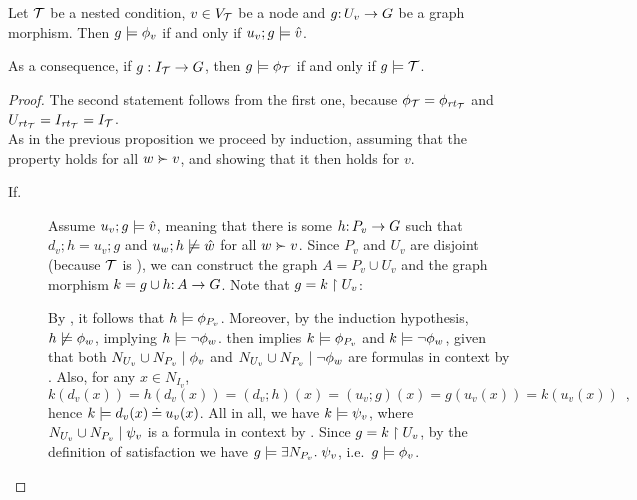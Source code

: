 \begin{theorem}
	\label{th:comparing satisfactions}
	Let ${\mathcal{T}}$ be a {\proper} nested condition, $v \in V_{\mathcal{T}}$ be a node and $g{:}\, U_v \rightarrow G$ be a graph morphism. Then $g\models \phi_v$ if and only if $u_v;g\models \hat v$. 
	
	As a consequence, if $g: I_{\mathcal{T}} \rightarrow G$, then $g\models\phi_{\mathcal{T}}$ if and only if $g\models{\mathcal{T}}$.
\end{theorem}
%
\begin{proof}
	The second statement follows from the first one, because $\phi_{\mathcal{T}} = \phi_{\mathit{rt}_{{\mathcal{T}}}}$ and $U_{\mathit{rt}_{{\mathcal{T}}}} = I_{\mathit{rt}_{{\mathcal{T}}}} = I_{\mathcal{T}}$.\\	
%
%
As in the previous proposition we proceed by induction, assuming that the property holds for all $w\childof v$, and showing that it then holds for $v$.
\begin{description}
\item[If.] Assume $u_v;g\models \hat v$, meaning that there is some $h{:}\, P_v\rightarrow G$ such that $d_v;h=u_v;g$ and $u_w;h\not\models \hat w$ for all $w\childof v$. Since $P_v$ and $U_v$ are disjoint (because ${\mathcal{T}}$ is {\proper}), we can construct the graph $A=P_v\cup U_v$ and the graph morphism $k=g\cup h{:}\, A\rightarrow G$. Note that 
$g = k \restriction U_v$: 

\smallskip
By , it follows that $h\models \phi_{P_v}$. Moreover, by the induction hypothesis, $h\not\models \phi_w$, implying $h\models\neg \phi_w$.  then implies $k\models \phi_{P_v}$ and $k\models \neg\phi_w$, given that both ${N_{U_v} \cup N_{P_v}} \mid {\phi_v}$ and ${N_{U_v} \cup N_{P_v}} \mid {\neg \phi_w}$ are formulas in context by .  Also, for any $x\in N_{I_v}$,
\[ k(d_v(x))=h(d_v(x))=(d_v;h)(x) = (u_v;g)(x) = g(u_v(x))=k(u_v(x)) \enspace, \]
hence $k\models d_v(x)\mathbin{\doteq} u_v(x)$. All in all, we have $k\models \psi_v$, where ${N_{U_v} \cup N_{P_v}} \mid {\psi_v}$ is a formula in context by . Since $g = k \restriction U_v$, by the definition of satisfaction we have  $g\models \exists N_{P_v}.\; \psi_v$, i.e.\ $g\models \phi_v$. 


\end{description}
\end{proof}
